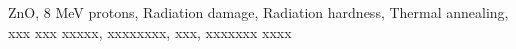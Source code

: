 \documentclass{ujarticle}
\begin{document}
\vspace*{-2.5mm}

\vspace*{-2.5mm}
\begin{center}
\begin{minipage}{130mm}
\baselineskip 12pt
{\fontsize{9.5pt}{0pt}\selectfont  %
ZnO, 8 MeV protons, Radiation damage, Radiation hardness, 
Thermal annealing, xxx xxx xxxxx, xxxxxxxx, xxx, xxxxxxx xxxx
}
\end{minipage}
\end{center}
\end{document}

